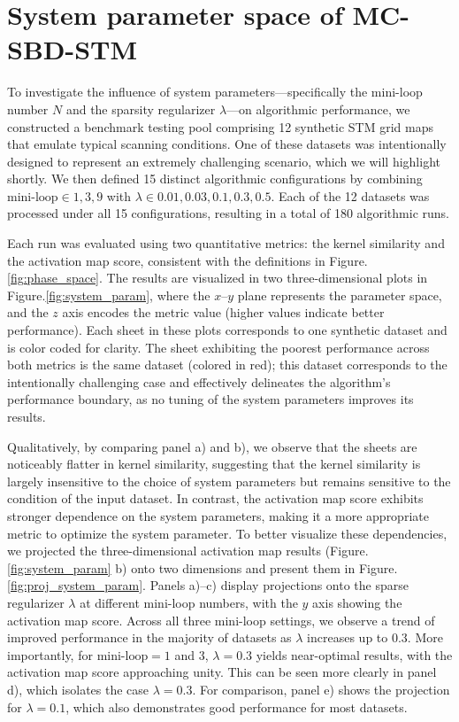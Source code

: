 \chapter{System parameter space of MC-SBD-STM}\label{appen:system_param}
To investigate the influence of system parameters—specifically the mini-loop number $N$ and the sparsity regularizer $\lambda$—on algorithmic performance, we constructed a benchmark testing pool comprising 12 synthetic \ac{STM} grid maps that emulate typical scanning conditions. One of these datasets was intentionally designed to represent an extremely challenging scenario, which we will highlight shortly. We then defined 15 distinct algorithmic configurations by combining $\text{mini-loop} \in {1, 3, 9}$ with $\lambda \in {0.01, 0.03, 0.1, 0.3, 0.5}$. Each of the 12 datasets was processed under all 15 configurations, resulting in a total of 180 algorithmic runs.

Each run was evaluated using two quantitative metrics: the kernel similarity and the activation map score, consistent with the definitions in Figure.\ref{fig:phase_space}. The results are visualized in two three-dimensional plots in Figure.\ref{fig:system_param}, where the $x$–$y$ plane represents the parameter space, and the $z$ axis encodes the metric value (higher values indicate better performance). Each sheet in these plots corresponds to one synthetic dataset and is color coded for clarity. The sheet exhibiting the poorest performance across both metrics is the same dataset (colored in red); this dataset corresponds to the intentionally challenging case and effectively delineates the algorithm’s performance boundary, as no tuning of the system parameters improves its results.

Qualitatively, by comparing panel a) and b), we observe that the sheets are noticeably flatter in kernel similarity, suggesting that the kernel similarity is largely insensitive to the choice of system parameters but remains sensitive to the condition of the input dataset. In contrast, the activation map score exhibits stronger dependence on the system parameters, making it a more appropriate metric to optimize the system parameter. To better visualize these dependencies, we projected the three-dimensional activation map results (Figure.\ref{fig:system_param} b) onto two dimensions and present them in Figure.\ref{fig:proj_system_param}. Panels a)–c) display projections onto the sparse regularizer $\lambda$ at different mini-loop numbers, with the $y$ axis showing the activation map score. Across all three mini-loop settings, we observe a trend of improved performance in the majority of datasets as $\lambda$ increases up to 0.3. More importantly, for $\text{mini-loop} = 1$ and $3$, $\lambda = 0.3$ yields near-optimal results, with the activation map score approaching unity. This can be seen more clearly in panel d), which isolates the case $\lambda = 0.3$. For comparison, panel e) shows the projection for $\lambda = 0.1$, which also demonstrates good performance for most datasets.

